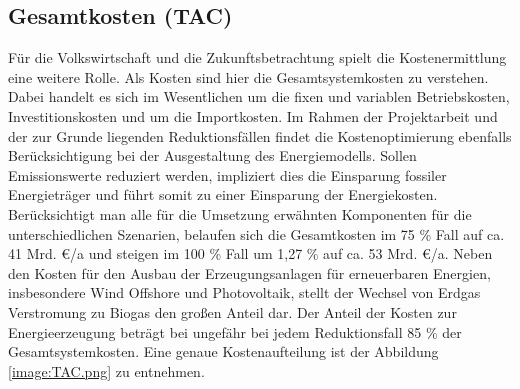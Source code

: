 \subsection{Gesamtkosten (TAC)}
Für die Volkswirtschaft und die Zukunftsbetrachtung spielt die Kostenermittlung eine weitere Rolle. Als Kosten sind hier die Gesamtsystemkosten zu verstehen. Dabei handelt es sich im Wesentlichen um die fixen und variablen Betriebskosten, Investitionskosten und um die Importkosten. Im Rahmen der Projektarbeit und der zur Grunde liegenden Reduktionsfällen findet die Kostenoptimierung ebenfalls Berücksichtigung bei der Ausgestaltung des Energiemodells. Sollen Emissionswerte reduziert werden, impliziert dies die Einsparung fossiler Energieträger und führt somit zu einer Einsparung der Energiekosten. Berücksichtigt man alle für die Umsetzung erwähnten Komponenten für die unterschiedlichen Szenarien, belaufen sich die Gesamtkosten im 75 \% Fall auf ca. 41 Mrd. €/a und steigen im 100 \% Fall um 1,27 \% auf ca. 53 Mrd. €/a. Neben den Kosten für den Ausbau der Erzeugungsanlagen für erneuerbaren Energien, insbesondere Wind Offshore und Photovoltaik, stellt der Wechsel von Erdgas Verstromung zu Biogas den großen Anteil dar. Der Anteil der Kosten zur Energieerzeugung beträgt bei ungefähr bei jedem Reduktionsfall 85 \% der Gesamtsystemkosten. Eine genaue Kostenaufteilung ist der Abbildung \ref{image:TAC.png} zu entnehmen. 

